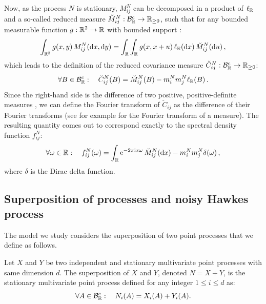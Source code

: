         Now, as the process $N$ is stationary,
        $M_{ij}^N$ can be decomposed in a product of $\ell_{{\mathbb R}}$ and a so-called reduced measure $\breve M_{ij}^N : \mathcal B_{\mathbb R}^c \to {\mathbb R}_{\ge0}$,
        such that for any bounded measurable function $g : {\mathbb R}^2 \to {\mathbb R}$ with bounded support \parencite[Equation 8.1.1a]{DaleyV1}:
        \begin{equation}\label{eq:chap4_reduced_moment_measure_property}
            \int_{{\mathbb R}^2}{g(x,y) \, M_{ij}^N({\mathrm{d}} x, {\mathrm{d}} y)} = \int_{\mathbb R} \int_{\mathbb R} {g(x, x+u) \,\ell_{{\mathbb R}}({\mathrm{d}} x) \, \breve M_{ij}^N({\mathrm{d}} u)}\,,
        \end{equation}
        which leads to the definition of the reduced covariance measure \(\breve C_{ij}^N : \mathcal B_{\mathbb R}^c \to {\mathbb R}_{\ge0}\):
        \begin{equation}\label{eq:chap4_breve_c_definition}
        		\forall B \in \mathcal B_{\mathbb R}^c: \quad
        		\breve C_{ij}^N(B) = \breve M_{ij}^N(B) - m_i^N m_j^N\ell_{{\mathbb R}}(B)\,.
        \end{equation}
        Since the right-hand side is the difference of two positive, positive-definite measures \parencite[Section~8.6]{DaleyV1}, 
        we can define the Fourier transform of $\breve C_{ij}$ as the difference of their Fourier transforms (see for example \parencite[Equation 5.2.1]{Pinsky2008} for the Fourier transform of a measure).
        The resulting quantity comes out to correspond exactly to the spectral density function \(f^N_{ij}\):
        \begin{equation}\label{eq:chap4_spectral_reduced}
          \forall \omega\in{\mathbb R}: \quad
          f^N_{ij}(\omega) = \int_{{\mathbb R}}{\mathrm{e}^{-2\pi \mathrm{i} x \omega} \,\breve M_{ij}^N(\mathrm{d}x)} - m_i^N m_j^N \delta(\omega)\,,
        \end{equation}
        where \(\delta\) is the Dirac delta function.
    
        
      \subsection{Superposition of processes and noisy Hawkes process}\label{sec:chap4_superposition}
        The model we study considers the superposition of two point processes that we define as follows.
        \begin{definition}\label{def:chap4_superposition}
          Let $X$ and $Y$ be two independent and stationary multivariate point processes with same dimension $d$.
          The superposition of $X$ and $Y$, denoted $N = X + Y$, is the stationary multivariate point process defined for any integer $1 \le i \le d$ as:
          \[
            \forall A \in \mathcal B_{\mathbb R}^c:
            \quad
            N_i(A) = X_i(A) + Y_i(A).
          \]
        \end{definition}
        
